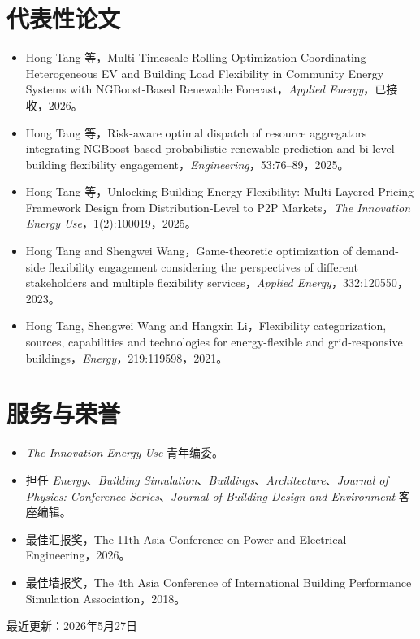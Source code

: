\documentclass[11pt,a4paper]{ctexart}
\begin{document}
\section*{代表性论文}
\begin{itemize}
\item Hong Tang 等，Multi-Timescale Rolling Optimization Coordinating Heterogeneous EV and Building Load Flexibility in Community Energy Systems with NGBoost-Based Renewable Forecast，\emph{Applied Energy}，已接收，2026。
\item Hong Tang 等，Risk-aware optimal dispatch of resource aggregators integrating NGBoost-based probabilistic renewable prediction and bi-level building flexibility engagement，\emph{Engineering}，53:76--89，2025。
\item Hong Tang 等，Unlocking Building Energy Flexibility: Multi-Layered Pricing Framework Design from Distribution-Level to P2P Markets，\emph{The Innovation Energy Use}，1(2):100019，2025。
\item Hong Tang and Shengwei Wang，Game-theoretic optimization of demand-side flexibility engagement considering the perspectives of different stakeholders and multiple flexibility services，\emph{Applied Energy}，332:120550，2023。
\item Hong Tang, Shengwei Wang and Hangxin Li，Flexibility categorization, sources, capabilities and technologies for energy-flexible and grid-responsive buildings，\emph{Energy}，219:119598，2021。
\end{itemize}

\section*{服务与荣誉}
\begin{itemize}
\item \emph{The Innovation Energy Use} 青年编委。
\item 担任 \emph{Energy}、\emph{Building Simulation}、\emph{Buildings}、\emph{Architecture}、\emph{Journal of Physics: Conference Series}、\emph{Journal of Building Design and Environment} 客座编辑。
\item 最佳汇报奖，The 11th Asia Conference on Power and Electrical Engineering，2026。
\item 最佳墙报奖，The 4th Asia Conference of International Building Performance Simulation Association，2018。
\end{itemize}

\vfill
\noindent 最近更新：2026年5月27日
\end{document}
